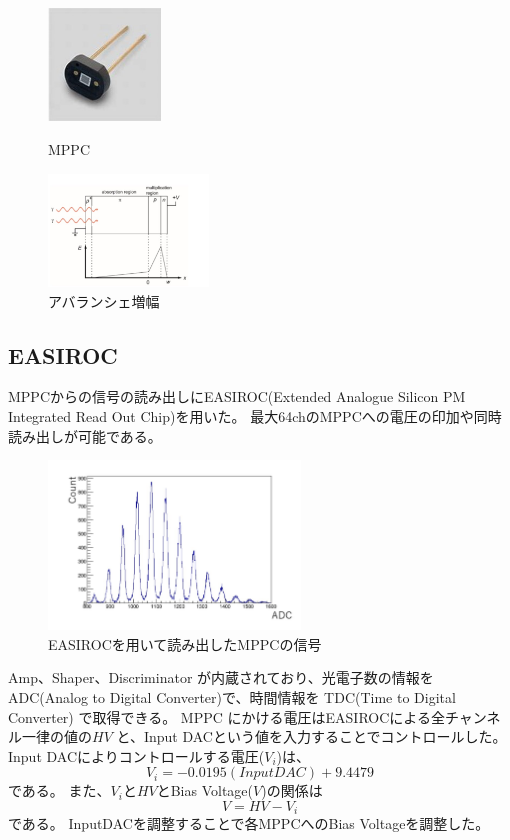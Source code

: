\begin{figure}[H]
    \begin{minipage}[b]{0.45\linewidth}
        \centering
        \includegraphics[height=3cm]{img/1_mppc.jpg}
        \caption{MPPC}
    \end{minipage}
    \begin{minipage}[b]{0.45\linewidth}
        \centering
        \includegraphics[height=3cm]{img/avalanche.jpg}
        \caption{アバランシェ増幅}
    \end{minipage}
\end{figure}

\subsection{EASIROC}
MPPCからの信号の読み出しにEASIROC(Extended Analogue Silicon PM Integrated Read Out Chip)を用いた。
最大64chのMPPCへの電圧の印加や同時読み出しが可能である。

\begin{figure}[H]
    \centering
    \includegraphics[height=4.5cm]{img/mppc_easiroc.jpg}
    \caption{EASIROCを用いて読み出したMPPCの信号}
\end{figure}

Amp、Shaper、Discriminator が内蔵されており、光電子数の情報をADC(Analog to Digital Converter)で、時間情報を TDC(Time to Digital Converter) で取得できる。
MPPC にかける電圧はEASIROCによる全チャンネル一律の値の$HV$ と、Input DACという値を入力することでコントロールした。
Input DACによりコントロールする電圧($V_i$)は、
\begin{equation}
    V_i = -0.0195(InputDAC) + 9.4479
\end{equation}
である。
また、$V_i$と$HV$とBias Voltage($V$)の関係は
\begin{equation}
    V = HV - V_i
\end{equation}
である。
InputDACを調整することで各MPPCへのBias Voltageを調整した。

